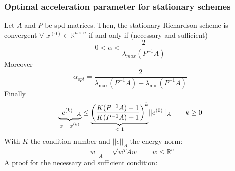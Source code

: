     \subsubsection{Optimal acceleration parameter for stationary schemes}
    Let $A$ and $P$ be spd matrices. Then, the stationary Richardson scheme is convergent $ \forall\,\,x^{(0)}\in\mathbb{R}^{n\times n}$ if and only if (necessary and sufficient)
    $$
    0<\alpha<\frac{2}{\lambda_{max}(P^{-1}A)}
    $$
    Moreover
    $$
    \alpha_{opt}=\frac{2}{\lambda_{\max}(P^{-1}A)+\lambda_{\min}(P^{-1}A)}
    $$
    Finally
    $$
    \underlabel{||e^{(k)}||_A}{$x-x^{(k)}$}\leq
    \underlabel{
        \left(
            \frac{
                K(P^{-1}A)-1
            }{
                K(P^{-1}A)+1
            }
        \right)^k
    }{
        $<1$
    }||e^{(0)}||_A
    \qquad k\geq 0
    $$
    With $K$ the condition number and $||e||_A$ the energy norm:
    $$
    ||w||_A=\sqrt{w^TAw}\qquad w\leq\mathbb{R}^n
    $$
    A proof for the necessary and sufficient condition:
